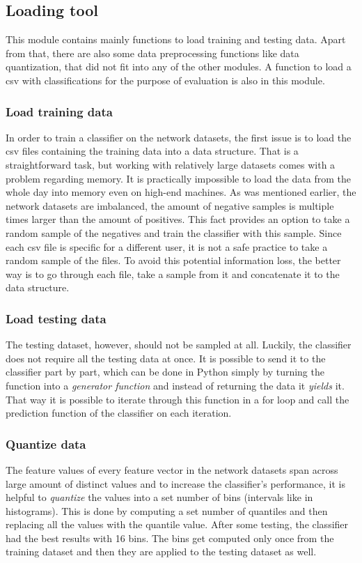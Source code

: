 \documentclass[11pt]{article}
\begin{document}
    \subsection{Loading tool}
      This module contains mainly functions to load training and testing data. Apart from that, there are also some data preprocessing functions like data quantization, that did not fit into any of the other modules. A function to load a csv with classifications for the purpose of evaluation is also in this module.
      \subsubsection{Load training data}
        In order to train a classifier on the network datasets, the first issue is to load the csv files containing the training data into a data structure. That is a straightforward task, but working with relatively large datasets comes with a problem regarding memory. It is practically impossible to load the data from the whole day into memory even on high-end machines. As was mentioned earlier, the network datasets are imbalanced, the amount of negative samples is multiple times larger than the amount of positives. This fact provides an option to take a random sample of the negatives and train the classifier with this sample. Since each csv file is specific for a different user, it is not a safe practice to take a random sample of the files. To avoid this potential information loss, the better way is to go through each file, take a sample from it and concatenate it to the data structure.
      \subsubsection{Load testing data}
        The testing dataset, however, should not be sampled at all. Luckily, the classifier does not require all the testing data at once. It is possible to send it to the classifier part by part, which can be done in Python simply by turning the function into a {\it generator function}\cite{python} and instead of returning the data it {\it yields} it. That way it is possible to iterate through this function in a for loop and call the prediction function of the classifier on each iteration.
      \subsubsection{Quantize data}
        The feature values of every feature vector in the network datasets span across large amount of distinct values and to increase the classifier's performance, it is helpful to {\it quantize} the values into a set number of bins (intervals like in histograms). This is done by computing a set number of quantiles and then replacing all the values with the quantile value. After some testing, the classifier had the best results with 16 bins. The bins get computed only once from the training dataset and then they are applied to the testing dataset as well.
\end{document}
